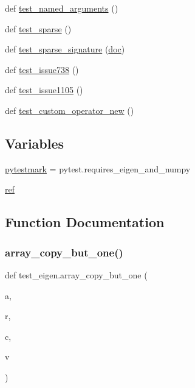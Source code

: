 \begin{DoxyCompactItemize}
def \mbox{\hyperlink{namespacetest__eigen_a9625cae80f44d0f43e53a204c55ad8b9}{test\+\_\+named\+\_\+arguments}} ()
\item 
def \mbox{\hyperlink{namespacetest__eigen_a45a2b15e05ba5072bf8769a50a95e06f}{test\+\_\+sparse}} ()
\item 
def \mbox{\hyperlink{namespacetest__eigen_a4314ddf28b061562572d0b5a3f6ec0de}{test\+\_\+sparse\+\_\+signature}} (\mbox{\hyperlink{structdoc}{doc}})
\item 
def \mbox{\hyperlink{namespacetest__eigen_a837393994e5023cb1b348a2da265ef0b}{test\+\_\+issue738}} ()
\item 
def \mbox{\hyperlink{namespacetest__eigen_a6ff4fd141b1b9756e18b7b04dd7f95f0}{test\+\_\+issue1105}} ()
\item 
def \mbox{\hyperlink{namespacetest__eigen_accb765e41bdd8973d2c7392c45dce52b}{test\+\_\+custom\+\_\+operator\+\_\+new}} ()
\end{DoxyCompactItemize}
\subsection*{Variables}
\begin{DoxyCompactItemize}
\item 
\mbox{\hyperlink{namespacetest__eigen_a67b7446e01292ca29cc1e913e2cbe78a}{pytestmark}} = pytest.\+requires\+\_\+eigen\+\_\+and\+\_\+numpy
\item 
\mbox{\hyperlink{namespacetest__eigen_a399f364735b6f96d36007e558aea7041}{ref}}
\end{DoxyCompactItemize}


\subsection{Function Documentation}
\mbox{\label{namespacetest__eigen_a74cccbaeee0c7a25b7bf08e1e761d10e}} 
\subsubsection{\texorpdfstring{array\_copy\_but\_one()}{array\_copy\_but\_one()}}
{\footnotesize\ttfamily def test\+\_\+eigen.\+array\+\_\+copy\+\_\+but\+\_\+one (\begin{DoxyParamCaption}\item[{}]{a,  }\item[{}]{r,  }\item[{}]{c,  }\item[{}]{v }\end{DoxyParamCaption})}


